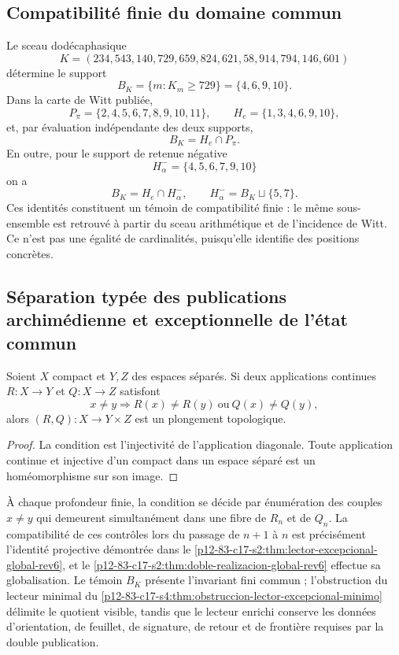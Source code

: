 \subsection{Compatibilité finie du domaine commun}

Le sceau dodécaphasique
\[
 K=(234,543,140,729,659,824,621,58,914,794,146,601)
\]
détermine le support
\[
 B_K=\{m:K_m\geq729\}=\{4,6,9,10\}.
\]
Dans la carte de Witt publiée,
\[
 P_\pi=\{2,4,5,6,7,8,9,10,11\},
 \qquad
 H_e=\{1,3,4,6,9,10\},
\]
et, par évaluation indépendante des deux supports,
\[
 \boxed{B_K=H_e\cap P_\pi.}
\]
En outre, pour le support de retenue négative
\[
 H_\alpha^-=\{4,5,6,7,9,10\}
\]
on a
\[
 B_K=H_e\cap H_\alpha^-,
 \qquad H_\alpha^-=B_K\sqcup\{5,7\}.
\]
Ces identités constituent un témoin de compatibilité finie : le même
sous-ensemble est retrouvé à partir du sceau arithmétique et de l'incidence de
Witt. Ce n'est pas une égalité de cardinalités, puisqu'elle identifie des positions
concrètes.

\subsection{Séparation typée des publications archimédienne et exceptionnelle de l'état commun}

\begin{theorem}
Soient \(X\) compact et \(Y,Z\) des espaces séparés. Si deux applications
continues \(R:X\to Y\) et \(Q:X\to Z\) satisfont
\[
 x\neq y\Longrightarrow R(x)\neq R(y)\ \text{ou}\ Q(x)\neq Q(y),
\]
alors \((R,Q):X\to Y\times Z\) est un plongement topologique.
\end{theorem}

\begin{proof}
La condition est l'injectivité de l'application diagonale. Toute application
continue et injective d'un compact dans un espace séparé est un
homéomorphisme sur son image.
\end{proof}

À chaque profondeur finie, la condition se décide par énumération des
couples \(x\neq y\) qui demeurent simultanément dans une fibre de \(R_n\) et
de \(Q_n\). La compatibilité de ces contrôles lors du passage de \(n+1\) à \(n\)
est précisément l'identité projective démontrée dans le
\cref{p12-83-c17-s2:thm:lector-excepcional-global-rev6}, et le
\cref{p12-83-c17-s2:thm:doble-realizacion-global-rev6} effectue sa
globalisation. Le témoin \(B_K\) présente l'invariant fini commun ;
l'obstruction du lecteur minimal du
\cref{p12-83-c17-s4:thm:obstruccion-lector-excepcional-minimo} délimite le
quotient visible, tandis que le lecteur enrichi conserve les données
d'orientation, de feuillet, de signature, de retour et de frontière requises par la double
publication.


